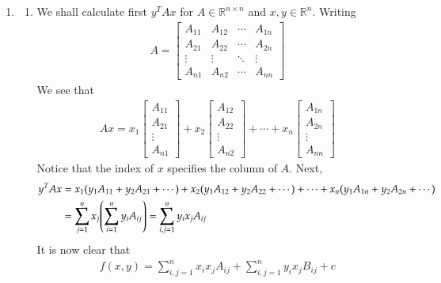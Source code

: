 \documentclass[12pt]{article}
\theoremstyle{definitionstyle}
\def\mbb#1{\mathbb{#1}}
\def \R{\mbb{R}}
\begin{document}
\begin{enumerate}[leftmargin=\labelsep]
\begin{enumerate}
		\end{enumerate}
	
		\item \begin{enumerate}
			\item We shall calculate first $y^TAx$ for $A \in \R^{n \times n}$ and $x,y \in \R^n$. Writing 
			\begin{align*}
				A = \begin{bmatrix}
					A_{11} & A_{12} & \cdots & A_{1n} \\
					A_{21} & A_{22} & \cdots & A_{2n} \\
					\vdots & \vdots & \ddots & \vdots \\
					A_{n1} & A_{n2} & \cdots & A_{nn}
				\end{bmatrix}
			\end{align*}
			We see that
			\begin{align*}
				Ax = x_1 \begin{bmatrix} A_{11} \\ A_{21} \\ \vdots \\ A_{n1} \end{bmatrix} + x_2 \begin{bmatrix} A_{12} \\ A_{22} \\ \vdots \\ A_{n2} \end{bmatrix} + \cdots + x_n \begin{bmatrix} A_{1n} \\ A_{2n} \\ \vdots \\ A_{nn} \end{bmatrix}
			\end{align*}
			Notice that the index of $x$ specifies the column of $A$. Next,
			\begin{align*}
				y^TAx &= x_1(y_1A_{11} + y_2A_{21} + \cdots) + x_2(y_1A_{12} + y_2A_{22} + \cdots) + \cdots + x_n(y_1A_{1n} + y_2A_{2n} + \cdots) 
				\\&= \sum_{j=1}^n x_j \qty(\sum_{i=1}^n y_i A_{ij}) = \sum_{i, j=1}^n y_ix_jA_{ij}
			\end{align*}
			It is now clear that 
			\begin{align*}
				f(x,y) = \sum_{i,j=1}^n x_ix_jA_{ij} + \sum_{i,j=1}^n y_ix_jB_{ij} + c
			\end{align*}
		

\end{enumerate}
\end{enumerate}
\end{document}
